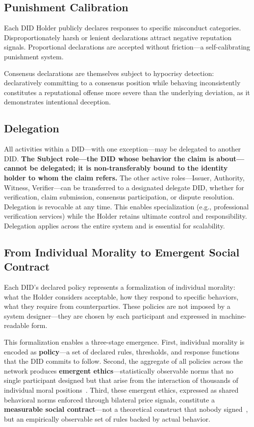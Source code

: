 \documentclass[11pt,a4paper,twocolumn]{article}
\begin{document}
\subsection{Punishment Calibration}

Each DID Holder publicly declares responses to specific misconduct categories. Disproportionately harsh or lenient declarations attract negative reputation signals. Proportional declarations are accepted without friction---a self-calibrating punishment system.

Consensus declarations are themselves subject to hypocrisy detection: declaratively committing to a consensus position while behaving inconsistently constitutes a reputational offense more severe than the underlying deviation, as it demonstrates intentional deception.

\subsection{Delegation}

All activities within a DID---with one exception---may be delegated to another DID. \textbf{The Subject role---the DID whose behavior the claim is about---cannot be delegated; it is non-transferably bound to the identity holder to whom the claim refers.} The other active roles---Issuer, Authority, Witness, Verifier---can be transferred to a designated delegate DID, whether for verification, claim submission, consensus participation, or dispute resolution. Delegation is revocable at any time. This enables specialization (e.g., professional verification services) while the Holder retains ultimate control and responsibility. Delegation applies across the entire system and is essential for scalability.

\subsection{From Individual Morality to Emergent Social Contract}

Each DID's declared policy represents a formalization of individual morality: what the Holder considers acceptable, how they respond to specific behaviors, what they require from counterparties. These policies are not imposed by a system designer---they are chosen by each participant and expressed in machine-readable form.

This formalization enables a three-stage emergence. First, individual morality is encoded as \textbf{policy}---a set of declared rules, thresholds, and response functions that the DID commits to follow. Second, the aggregate of all policies across the network produces \textbf{emergent ethics}---statistically observable norms that no single participant designed but that arise from the interaction of thousands of individual moral positions~\cite{durkheim1893}. Third, these emergent ethics, expressed as shared behavioral norms enforced through bilateral price signals, constitute a \textbf{measurable social contract}---not a theoretical construct that nobody signed~\cite{rawls1971}, but an empirically observable set of rules backed by actual behavior.
\end{document}
